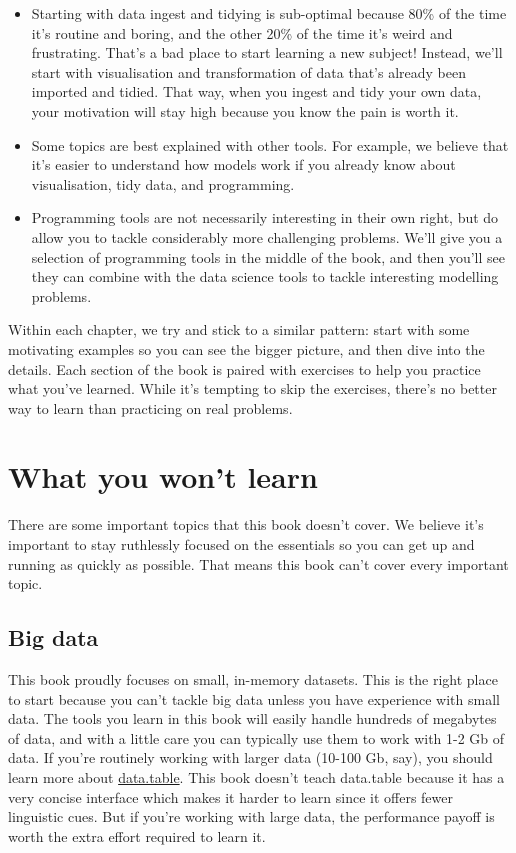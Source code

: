 \documentclass[]{book}
\begin{document}
\begin{itemize}
\item
  Starting with data ingest and tidying is sub-optimal because 80\% of
  the time it's routine and boring, and the other 20\% of the time it's
  weird and frustrating. That's a bad place to start learning a new
  subject! Instead, we'll start with visualisation and transformation of
  data that's already been imported and tidied. That way, when you
  ingest and tidy your own data, your motivation will stay high because
  you know the pain is worth it.
\item
  Some topics are best explained with other tools. For example, we
  believe that it's easier to understand how models work if you already
  know about visualisation, tidy data, and programming.
\item
  Programming tools are not necessarily interesting in their own right,
  but do allow you to tackle considerably more challenging problems.
  We'll give you a selection of programming tools in the middle of the
  book, and then you'll see they can combine with the data science tools
  to tackle interesting modelling problems.
\end{itemize}

Within each chapter, we try and stick to a similar pattern: start with
some motivating examples so you can see the bigger picture, and then
dive into the details. Each section of the book is paired with exercises
to help you practice what you've learned. While it's tempting to skip
the exercises, there's no better way to learn than practicing on real
problems.

\section{What you won't learn}\label{what-you-wont-learn}

There are some important topics that this book doesn't cover. We believe
it's important to stay ruthlessly focused on the essentials so you can
get up and running as quickly as possible. That means this book can't
cover every important topic.

\subsection{Big data}\label{big-data}

This book proudly focuses on small, in-memory datasets. This is the
right place to start because you can't tackle big data unless you have
experience with small data. The tools you learn in this book will easily
handle hundreds of megabytes of data, and with a little care you can
typically use them to work with 1-2 Gb of data. If you're routinely
working with larger data (10-100 Gb, say), you should learn more about
\href{https://github.com/Rdatatable/data.table}{data.table}. This book
doesn't teach data.table because it has a very concise interface which
makes it harder to learn since it offers fewer linguistic cues. But if
you're working with large data, the performance payoff is worth the
extra effort required to learn it.
\end{document}
